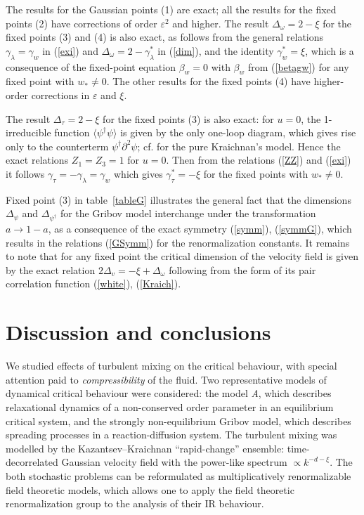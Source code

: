 \documentclass[12pt]{article}
\begin{document}
The results for the Gaussian points (1) are exact; all the results for the
fixed points (2) have corrections of order $\varepsilon^{2}$ and higher.
The result
$\Delta_{\omega}=2-\xi$ for the fixed points (3) and (4) is also exact,
as follows from the general relations $\gamma_{\lambda}=\gamma_{w}$ in
(\ref{exi}) and $\Delta_{\omega}=2-\gamma_{\lambda}^{*}$ in (\ref{dim}),
and the identity $\gamma_{w}^{*}= \xi$, which is a consequence of the
fixed-point equation $\beta_{w}=0$ with $\beta_{w}$ from (\ref{betagw})
for any fixed point with $w_{*}\ne 0$. The other results for the fixed
points (4) have higher-order corrections in $\varepsilon$ and $\xi$.

The result $\Delta_{\tau}=2-\xi$ for the fixed points (3) is also exact:
for $u=0$, the 1-irreducible function $\langle \psi^{\dag} \psi \rangle$
is given by the only one-loop diagram, which gives rise only to the
counterterm $\psi^{\dag}\partial^{2} \psi$; cf. \cite{JphysA} for the pure
Kraichnan's model. Hence the exact relations $Z_{1}=Z_{3}=1$ for $u=0$.
Then from the relations (\ref{ZZ}) and (\ref{exi})
it follows $\gamma_{\tau}=-\gamma_{\lambda}=\gamma_{w}$ which gives
$\gamma_{\tau}^{*}= -\xi$ for the fixed points with $w_{*}\ne 0$.

Fixed point (3) in table~\ref{tableG} illustrates the general fact that
the dimensions $\Delta_{\psi}$ and $\Delta_{\psi^{\dag}}$ for the Gribov
model interchange under the transformation $a\to1-a$, as a consequence of
the exact symmetry (\ref{symm}), (\ref{symmG}), which results in the
relations (\ref{GSymm}) for the renormalization constants.
It remains to note that for any fixed point the critical dimension of the
velocity field is given by the exact relation
$2\Delta_{v}=-\xi+\Delta_{\omega}$ following from the form of its
pair correlation function (\ref{white}), (\ref{Kraich}).



\section{Discussion and conclusions} \label{sec:Conc}


We studied effects of turbulent mixing on the critical behaviour, with
special attention paid to {\it compressibility} of the fluid. Two
representative models of dynamical critical behaviour were considered:
the model {\it A}, which describes relaxational dynamics of a non-conserved
order parameter in an equilibrium critical system, and the strongly
non-equilibrium Gribov model, which describes spreading processes in
a reaction-diffusion system. The turbulent mixing was modelled by the
Kazantsev--Kraichnan ``rapid-change'' ensemble: time-decorrelated Gaussian
velocity field with the power-like spectrum $\propto k^{-d-\xi}$.
The both stochastic problems can be reformulated as multiplicatively
renormalizable field theoretic models, which allows one to apply the field
theoretic renormalization group to the analysis of their IR behaviour.
\end{document}
